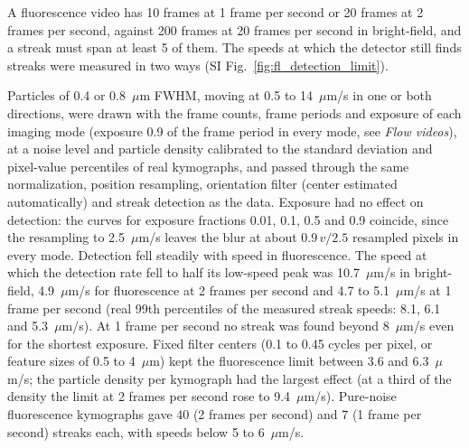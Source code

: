
A fluorescence video has 10 frames at 1 frame per second or 20 frames at 2 frames per second, against 200 frames at 20 frames per second in bright-field, and a streak must span at least 5 of them.
The speeds at which the detector still finds streaks were measured in two ways (SI Fig.~\ref{fig:fl_detection_limit}).

Particles of 0.4 or 0.8~$\mu$m FWHM, moving at 0.5 to 14~$\mu$m/s in one or both directions, were drawn with the frame counts, frame periods and exposure of each imaging mode (exposure 0.9 of the frame period in every mode, see \emph{Flow videos}), at a noise level and particle density calibrated to the standard deviation and pixel-value percentiles of real kymographs, and passed through the same normalization, position resampling, orientation filter (center estimated automatically) and streak detection as the data.
Exposure had no effect on detection: the curves for exposure fractions 0.01, 0.1, 0.5 and 0.9 coincide, since the resampling to 2.5~$\mu$m/s leaves the blur at about $0.9\,v/2.5$ resampled pixels in every mode.
Detection fell steadily with speed in fluorescence.
The speed at which the detection rate fell to half its low-speed peak was 10.7~$\mu$m/s in bright-field, 4.9~$\mu$m/s for fluorescence at 2 frames per second and 4.7 to 5.1~$\mu$m/s at 1 frame per second (real 99th percentiles of the measured streak speeds: 8.1, 6.1 and 5.3~$\mu$m/s).
At 1 frame per second no streak was found beyond 8~$\mu$m/s even for the shortest exposure.
Fixed filter centers (0.1 to 0.45 cycles per pixel, or feature sizes of 0.5 to 4~$\mu$m) kept the fluorescence limit between 3.6 and 6.3~$\mu$m/s; the particle density per kymograph had the largest effect (at a third of the density the limit at 2 frames per second rose to 9.4~$\mu$m/s).
Pure-noise fluorescence kymographs gave 40 (2 frames per second) and 7 (1 frame per second) streaks each, with speeds below 5 to 6~$\mu$m/s.

